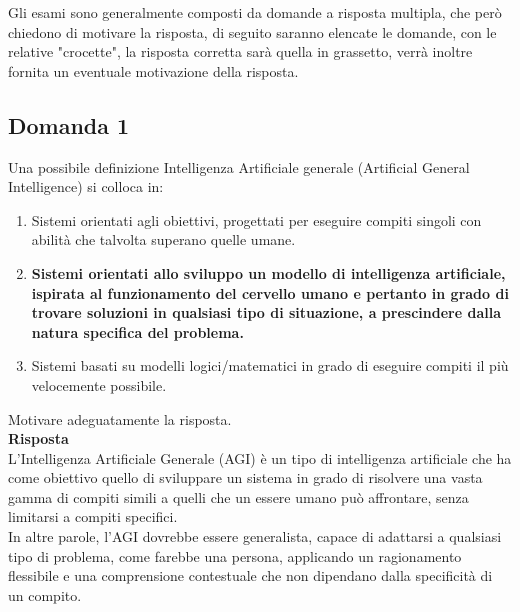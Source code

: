\documentclass[../main.tex]{subfiles}
\begin{document}
	Gli esami sono generalmente composti da domande a risposta multipla, che però chiedono di motivare la risposta, di seguito saranno elencate le domande, con le relative "crocette", la risposta corretta sarà quella in grassetto, verrà inoltre fornita un eventuale motivazione della risposta.
	\subsection{Domanda 1}
	Una possibile definizione Intelligenza Artificiale generale (Artificial General Intelligence) si colloca in:
	\begin{enumerate}
		\item Sistemi orientati agli obiettivi, progettati per eseguire compiti singoli con abilità che talvolta superano quelle umane. 
		\item \textbf{Sistemi orientati allo sviluppo un modello di intelligenza artificiale, ispirata al funzionamento del cervello umano e pertanto in grado di trovare soluzioni in qualsiasi tipo di situazione, a prescindere dalla natura specifica del problema.}
		\item Sistemi basati su modelli logici/matematici in grado di eseguire compiti il più velocemente possibile. 
	\end{enumerate}
	Motivare adeguatamente la risposta.\\
	\textbf{Risposta}\\
	L'Intelligenza Artificiale Generale (AGI) è un tipo di intelligenza artificiale che ha come obiettivo quello di sviluppare un sistema in grado di risolvere una vasta gamma di compiti simili a quelli che un essere umano può affrontare, senza limitarsi a compiti specifici.\\
	In altre parole, l'AGI dovrebbe essere generalista, capace di adattarsi a qualsiasi tipo di problema, come farebbe una persona, applicando un ragionamento flessibile e una comprensione contestuale che non dipendano dalla specificità di un compito.
\end{document}
